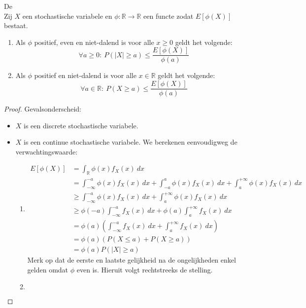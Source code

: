 \documentclass[main.tex]{subfiles}
\begin{document}
\begin{st}
  De \\
  Zij $X$ een stochastische variabele en $\phi:\mathbb{R} \rightarrow \mathbb{R}$ een functe zodat $E[\phi(X)]$ bestaat.
  \begin{enumerate}
  \item Als $\phi$ positief, even en niet-dalend is voor alle $x\ge 0$ geldt het volgende:
    \[ \forall a \ge 0:\ P(|X| \ge a) \le \frac{E[\phi(X)]}{\phi(a)} \]
  \item Als $\phi$ positief en niet-dalend is voor alle $x\in\mathbb{R}$ geldt het volgende:
    \[ \forall a \in \mathbb{R}:\ P(X \ge a) \le \frac{E[\phi(X)]}{\phi(a)} \]
  \end{enumerate}

  \begin{proof}
    Gevalsonderscheid:
    \begin{itemize}
    \item $X$ is een discrete stochastische variabele.
    \item $X$ is een continue stochastische variabele. 
      We berekenen eenvoudigweg de verwachtingswaarde:
      \begin{enumerate}
      \item 
        \begin{align*}
          E[\phi(X)]
          &= \int_{\mathbb{R}}\phi(x)f_{X}(x)\ dx\\
          &= \int_{-\infty}^{-a}\phi(x)f_{X}(x)\ dx + \int_{-a}^{a}\phi(x)f_{X}(x)\ dx + \int_{a}^{+\infty}\phi(x)f_{X}(x)\ dx\\
          &\ge \int_{-\infty}^{-a}\phi(x)f_{X}(x)\ dx + \int_{a}^{+\infty}\phi(x)f_{X}(x)\ dx\\
          &\ge \phi(-a)\int_{-\infty}^{-a}f_{X}(x)\ dx + \phi(a)\int_{a}^{+\infty}f_{X}(x)\ dx\\
          &= \phi(a) \left( \int_{-\infty}^{-a}f_{X}(x)\ dx + \int_{a}^{+\infty}f_{X}(x)\ dx\right)\\
          &= \phi(a) \left(P(X \le a) + P(X \ge a)\right)\\
          &= \phi(a)P(|X| \ge a)
        \end{align*}
        Merk op dat de eerste en laatste gelijkheid na de ongelijkheden enkel gelden omdat $\phi$ even is.
        Hieruit volgt rechtstreeks de stelling.
      \item
        \begin{align*}

\end{align*}
\end{enumerate}
\end{itemize}
\end{proof}
\end{st}
\end{document}
